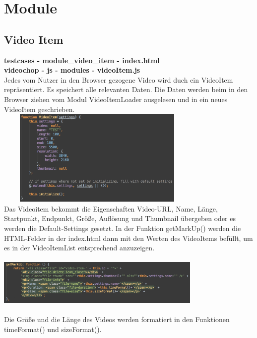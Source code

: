 \documentclass[a4paper,10pt]{scrartcl}
\begin{document}
\section{Module}
\subsection{Video Item}
\textbf{testcases - module\_video\_item - index.html} \\
\textbf{videochop - js - modules - videoItem.js} \\
Jedes vom Nutzer in den Browser gezogene Video wird duch ein VideoItem repräsentiert. Es speichert alle relevanten Daten. Die Daten werden beim in den Browser ziehen vom Modul VideoItemLoader ausgelesen und in ein neues VideoItem geschrieben.\\
\includegraphics[height=176px, width=375px]{images/videoitem.png}\\
Das Videoitem bekommt die Eigenschaften Video-URL, Name, Länge, Startpunkt, Endpunkt, Größe, Auflösung und Thumbnail übergeben oder es werden die Default-Settings gesetzt.
In der Funktion getMarkUp() werden die HTML-Felder in der index.html dann mit den Werten des VideoItems befüllt, um es in der VideoItemList entsprechend anzuzeigen. \\
\includegraphics[height=120px, width=375px]{images/videoitem2.png}\\
Die Größe und die Länge des Videos werden formatiert in den Funktionen timeFormat() und sizeFormat().
\end{document}
